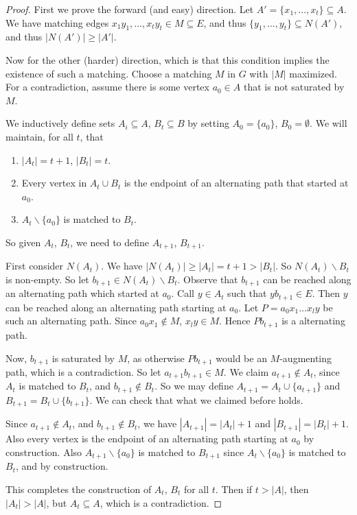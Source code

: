 \documentclass[a4paper]{scrartcl}
\begin{document}
\begin{proof}
	First we prove the forward (and easy) direction. Let $A' = \{x_1, \dots, x_t \} \subseteq A$. We have matching edges $x_1 y_1, \dots, x_t y_t \in M \subseteq E$, and thus $\{y_1, \dots, y_t\} \subseteq N(A')$, and thus $|N(A')| \geq |A'|$.

	Now for the other (harder) direction, which is that this condition implies the existence of such a matching. Choose a matching $M$ in $G$ with $|M|$ maximized. For a contradiction, assume there is some vertex $a_0 \in A$ that is not saturated by $M$.

	We inductively define sets $A_i \subseteq A$, $B_t \subseteq B$ by setting $A_0 = \{a_0\}$, $B_0 = \emptyset$. We will maintain, for all $t$, that
	\begin{enumerate}
		\item $|A_t| = t + 1$, $|B_t| = t$.
		\item Every vertex in $A_t \cup B_t$ is the endpoint of an alternating path that started at $a_0$. 
		\item $A_t \backslash \{a_0\}$ is matched to $B_t$.
	\end{enumerate}
	So given $A_t$, $B_t$, we need to define $A_{t + 1}$, $B_{t + 1}$.

	First consider $N(A_t)$. We have $|N(A_t)| \geq |A_t| = t + 1 > |B_t|$. So $N(A_t) \backslash B_t$ is non-empty. So let $b_{t + 1} \in N(A_t) \backslash B_t$. Observe that $b_{t + 1}$ can be reached along an alternating path which started at $a_0$. Call $y \in A_t$ such that $yb_{t + 1} \in E$. Then $y$ can be reached along an alternating path starting at $a_0$. Let $P = a_0 x_1 \dots x_l y$ be such an alternating path. Since $a_0x_1 \not \in M$, $x_l y \in M$. Hence $Pb_{t + 1}$ is a alternating path.

	Now, $b_{t + 1}$ is saturated by $M$, as otherwise $Pb_{t + 1}$ would be an $M$-augmenting path, which is a contradiction. So let $a_{t+1}b_{t+1} \in M$. We claim $a_{t + 1} \not \in A_t$, since $A_t$ is matched to $B_t$, and $b_{t + 1} \not \in B_t$. So we may define $A_{t + 1} = A_t \cup \{a_{t + 1}\}$ and $B_{t + 1} = B_t \cup \{b_{t + 1}\}$. We can check that what we claimed before holds. 

	Since $a_{t + 1} \not \in A_t$, and $b_{t + 1} \not \in B_t$, we have $|A_{t +1}| = |A_t| + 1$ and $|B_{t + 1}| = |B_t| + 1$. Also every vertex is the endpoint of an alternating path starting at $a_0$ by construction. Also $A_{t + 1}\backslash\{a_0\}$ is matched to $B_{t + 1}$ since $A_t\backslash\{a_0\}$ is matched to $B_t$, and by construction.

	This completes the construction of $A_t$, $B_t$ for all $t$. Then if $t > |A|$, then $|A_t| > |A|$, but $A_t \subseteq A$, which is a contradiction.
\end{proof}
\end{document}
